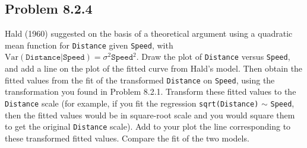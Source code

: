 \documentclass[12pt,oneside,a4paper]{article}\usepackage[]{graphicx}\usepackage[]{xcolor}
\newcommand{\subproblem}[1]
{
    \subsection*{Problem {#1}}
}
\newcommand{\m}[1]{\texttt{{#1}}}
\begin{document}
\subproblem{8.2.4}
Hald (1960) suggested on the basis of a theoretical argument using a quadratic mean function for \m{Distance} given \m{Speed}, with $\mathrm{Var}(\m{Distance}|\m{Speed})=\sigma^{2}\m{Speed}^2$. Draw the plot of \m{Distance} versus \m{Speed}, and add a line on the plot of the fitted curve from Hald’s model. Then obtain the fitted values from the fit of the transformed \m{Distance} on \m{Speed}, using the transformation you found in Problem 8.2.1. Transform these fitted values to the \m{Distance} scale (for example, if you fit the regression \m{sqrt(Distance)} $\sim$ \m{Speed}, then the fitted values would be in square-root scale and
you would square them to get the original \m{Distance} scale). Add to your plot the line corresponding to these transformed fitted values. Compare the fit of the two models.
\end{document}
